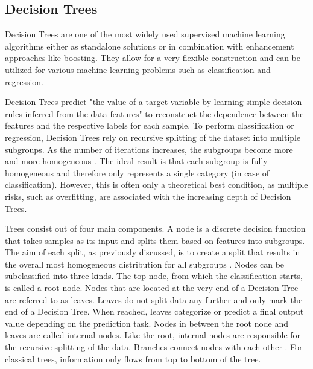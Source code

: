 \subsection{Decision Trees}
\label{sec:decision trees}

Decision Trees are one of the most widely used supervised machine learning algorithms either 
as standalone solutions or in combination with enhancement approaches like boosting. 
They allow for a very flexible construction and can be utilized for various machine learning problems
such as classification and regression.

Decision Trees predict "the value of a target variable by learning simple decision rules inferred 
from the data features" \cite{scikit-decision_tree} to reconstruct the dependence between the features and the respective labels for
each sample. To perform classification or regression, Decision Trees rely on recursive 
splitting of the dataset into multiple subgroups. As the number of iterations increases, the 
subgroups become more and more homogeneous \cite[p. 330]{James2021}. The ideal result is that each subgroup is fully 
homogeneous and therefore only represents a single category (in case of classification). However, 
this is often only a theoretical best condition, as multiple risks, such as overfitting, are 
associated with the increasing depth of Decision Trees.

Trees consist out of four main components. A node is a discrete decision function that takes 
samples as its input and splits them based on features into subgroups. The aim of each split, 
as previously discussed, is to create a split that results in the overall most homogeneous 
distribution for all subgroups \cite[p. 6]{lewis2000introduction}. Nodes can be subclassified into three kinds. The top-node, 
from which the classification starts, is called a root node. Nodes that are located at the 
very end of a Decision Tree are referred to as leaves. Leaves do not split data any further and 
only mark the end of a Decision Tree. When reached, leaves categorize or predict a final output 
value depending on the prediction task. Nodes in between the root node and leaves are called 
internal nodes. Like the root, internal nodes are responsible for the recursive splitting of 
the data. Branches connect nodes with each other \cite[p. 4]{lewis2000introduction}. For classical trees, information only flows from 
top to bottom of the tree.

